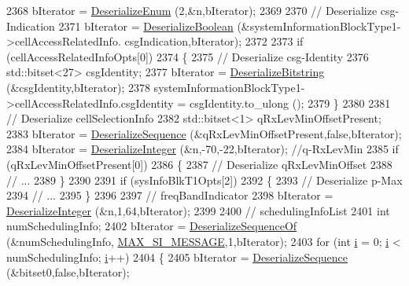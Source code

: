 \begin{DoxyCode}
2368   bIterator = \hyperlink{classns3_1_1Asn1Header_a4fcc253e0eec3483c775b005c1875f2d}{DeserializeEnum} (2,&n,bIterator);
2369 
2370   \textcolor{comment}{// Deserialize csg-Indication}
2371   bIterator = \hyperlink{classns3_1_1Asn1Header_ab46f4b86988a0fbeb5df11a9bc46222d}{DeserializeBoolean} (&systemInformationBlockType1->cellAccessRelatedInfo.
      csgIndication,bIterator);
2372 
2373   \textcolor{keywordflow}{if} (cellAccessRelatedInfoOpts[0])
2374     \{
2375       \textcolor{comment}{// Deserialize csg-Identity}
2376       std::bitset<27> csgIdentity;
2377       bIterator = \hyperlink{classns3_1_1Asn1Header_adb34498b05e8562fba5d40f49578968d}{DeserializeBitstring} (&csgIdentity,bIterator);
2378       systemInformationBlockType1->cellAccessRelatedInfo.csgIdentity = csgIdentity.to\_ulong ();
2379     \}
2380 
2381   \textcolor{comment}{// Deserialize cellSelectionInfo}
2382   std::bitset<1> qRxLevMinOffsetPresent;
2383   bIterator = \hyperlink{classns3_1_1Asn1Header_a58c68bb97ba3fe2e8fcdd7c208d672b2}{DeserializeSequence} (&qRxLevMinOffsetPresent,\textcolor{keyword}{false},bIterator);
2384   bIterator = \hyperlink{classns3_1_1Asn1Header_a49802c9af30018b078150e866b6ecae2}{DeserializeInteger} (&n,-70,-22,bIterator); \textcolor{comment}{//q-RxLevMin}
2385   \textcolor{keywordflow}{if} (qRxLevMinOffsetPresent[0])
2386     \{
2387       \textcolor{comment}{// Deserialize qRxLevMinOffset}
2388       \textcolor{comment}{// ...}
2389     \}
2390 
2391   \textcolor{keywordflow}{if} (sysInfoBlkT1Opts[2])
2392     \{
2393       \textcolor{comment}{// Deserialize p-Max}
2394       \textcolor{comment}{// ...}
2395     \}
2396 
2397   \textcolor{comment}{// freqBandIndicator}
2398   bIterator = \hyperlink{classns3_1_1Asn1Header_a49802c9af30018b078150e866b6ecae2}{DeserializeInteger} (&n,1,64,bIterator);
2399 
2400   \textcolor{comment}{// schedulingInfoList}
2401   \textcolor{keywordtype}{int} numSchedulingInfo;
2402   bIterator = \hyperlink{classns3_1_1Asn1Header_a1a7245e05b482df8abade0a060bd0ecc}{DeserializeSequenceOf} (&numSchedulingInfo,
      \hyperlink{lte-rrc-header_8cc_a99fed6f03b7fffb57efc4c875d0446b1}{MAX\_SI\_MESSAGE},1,bIterator);
2403   \textcolor{keywordflow}{for} (\textcolor{keywordtype}{int} \hyperlink{bernuolliDistribution_8m_a6f6ccfcf58b31cb6412107d9d5281426}{i} = 0; \hyperlink{bernuolliDistribution_8m_a6f6ccfcf58b31cb6412107d9d5281426}{i} < numSchedulingInfo; \hyperlink{bernuolliDistribution_8m_a6f6ccfcf58b31cb6412107d9d5281426}{i}++)
2404     \{
2405       bIterator = \hyperlink{classns3_1_1Asn1Header_a58c68bb97ba3fe2e8fcdd7c208d672b2}{DeserializeSequence} (&bitset0,\textcolor{keyword}{false},bIterator);

\end{DoxyCode}
